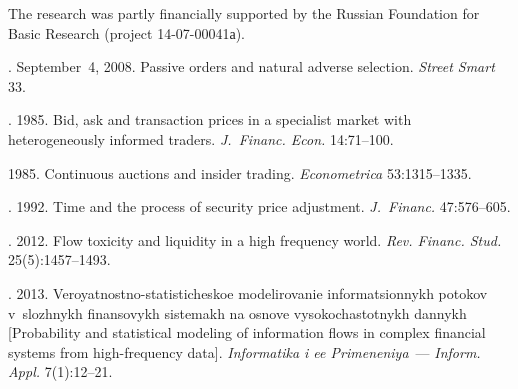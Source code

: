 


\Ack
\noindent
The research was partly financially supported by the Russian Foundation
for Basic Research (project 14-07-00041а).




  \begin{multicols}{2}

\renewcommand{\bibname}{\protect\rmfamily References}



{\small\frenchspacing
 {%
 \begin{thebibliography}{99}

. September~4, 2008.
Passive orders and natural adverse selection. {\it Street Smart} 33.

. 1985.
Bid, ask and transaction prices in a specialist market
with heterogeneously informed traders.
{\it J.~Financ. Econ.} 14:71--100.

 1985.
Continuous auctions and insider trading. {\it Econometrica} 53:1315--1335.

. 1992.
Time and the process of security price adjustment.
{\it J.~Financ.} 47:576--605.

. 2012.
Flow toxicity and liquidity in a high frequency world.
{\it Rev. Financ. Stud.} 25(5):1457--1493.

. 2013.
Veroyatnostno-statisticheskoe modelirovanie informatsionnykh
potokov v~slozhnykh finansovykh sistemakh na osnove vysokochastotnykh dannykh
[Probability and statistical modeling of information flows in complex financial
systems from high-frequency data]. \textit{Informatika i ee Primeneniya}~---
\textit{Inform. Appl.} 7(1):12--21.


\end{thebibliography}}}
\end{multicols}
